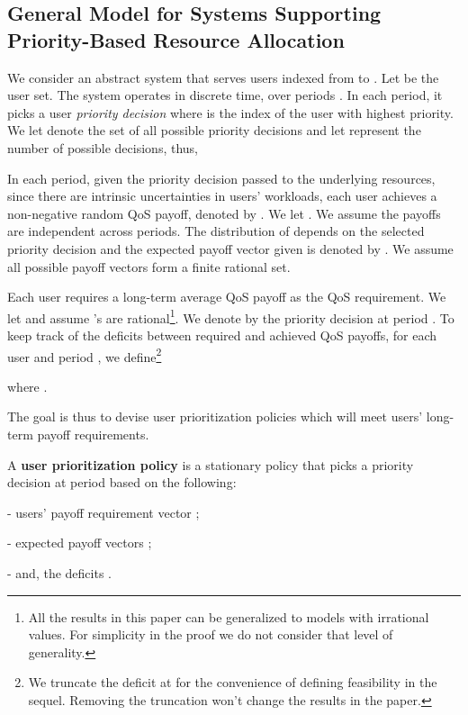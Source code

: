 \documentclass[prodmode,acmtompecs]{acmsmall}
\newcommand{\myComments}[1]{}
\newif\ifextended
\newcommand{\extendedStart}{\ifextended  \myComments{Extended version: }}
\newcommand{\commentEnd}{\myComments{End}}
\begin{document}
\subsection{General Model for Systems Supporting Priority-Based Resource Allocation} 
\label{subsection_general_payoff_model}
We consider an abstract system that serves  users indexed from  to . Let  be the user set. The system operates in discrete time, over periods . In each period, it picks a user {\em priority decision}  where  is the index of the user with  highest priority. We let  denote the set of all possible priority decisions and let  represent the number of possible decisions, thus,  

In each period, given the priority decision  passed to the underlying resources, since there are intrinsic uncertainties in users' workloads, 
each user  achieves a non-negative random QoS payoff, denoted by . We let . 
We assume the payoffs are independent across periods. 
The distribution of  depends on the selected priority decision  and the expected payoff vector given  is denoted by . We assume all possible payoff vectors form a finite rational set. 
\extendedStart
Moreover, we naturally assume that for each user , there exists a decision  such that . 
\commentEnd\fi

Each user requires a long-term average QoS payoff  as the QoS requirement. We let  and assume 's are rational\footnote{All the results in this paper can be generalized to models with irrational values. For simplicity in the proof we do not consider that level of generality. }. We denote by  the priority decision at period . To keep track of the deficits between required and achieved QoS payoffs, for each user  and period , we define\footnote{We truncate the deficit at  for the convenience of defining feasibility in the sequel. Removing the truncation won't change the results in the paper. }

where . 

The goal is thus to devise user prioritization policies which will meet users' long-term payoff requirements. 

\begin{definition}
A {\bf user prioritization policy} is a stationary policy that picks a priority decision  at period  based on the following:
\begin{longitem}
\item[-] users' payoff requirement vector ; 
\item[-] expected payoff vectors ; 
\item[-] and, the deficits . 
\end{longitem}
\end{definition}
\end{document}

